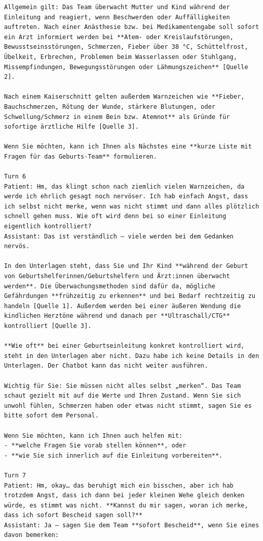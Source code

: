 \begin{Verbatim}[fontsize=\small,breaklines=true,breakanywhere=true]
Allgemein gilt: Das Team überwacht Mutter und Kind während der Einleitung and reagiert, wenn Beschwerden oder Auffälligkeiten auftreten. Nach einer Anästhesie bzw. bei Medikamentengabe soll sofort ein Arzt informiert werden bei **Atem- oder Kreislaufstörungen, Bewusstseinsstörungen, Schmerzen, Fieber über 38 °C, Schüttelfrost, Übelkeit, Erbrechen, Problemen beim Wasserlassen oder Stuhlgang, Missempfindungen, Bewegungsstörungen oder Lähmungszeichen** [Quelle 2].  

Nach einem Kaiserschnitt gelten außerdem Warnzeichen wie **Fieber, Bauchschmerzen, Rötung der Wunde, stärkere Blutungen, oder Schwellung/Schmerz in einem Bein bzw. Atemnot** als Gründe für sofortige ärztliche Hilfe [Quelle 3].

Wenn Sie möchten, kann ich Ihnen als Nächstes eine **kurze Liste mit Fragen für das Geburts-Team** formulieren.

Turn 6
Patient: Hm, das klingt schon nach ziemlich vielen Warnzeichen, da werde ich ehrlich gesagt noch nervöser. Ich hab einfach Angst, dass ich selbst nicht merke, wenn was nicht stimmt und dann alles plötzlich schnell gehen muss. Wie oft wird denn bei so einer Einleitung eigentlich kontrolliert?
Assistant: Das ist verständlich — viele werden bei dem Gedanken nervös.

In den Unterlagen steht, dass Sie und Ihr Kind **während der Geburt von Geburtshelferinnen/Geburtshelfern und Ärzt:innen überwacht werden**. Die Überwachungsmethoden sind dafür da, mögliche Gefährdungen **frühzeitig zu erkennen** und bei Bedarf rechtzeitig zu handeln [Quelle 1]. Außerdem werden bei einer äußeren Wendung die kindlichen Herztöne während und danach per **Ultraschall/CTG** kontrolliert [Quelle 3].

**Wie oft** bei einer Geburtseinleitung konkret kontrolliert wird, steht in den Unterlagen aber nicht. Dazu habe ich keine Details in den Unterlagen. Der Chatbot kann das nicht weiter ausführen.

Wichtig für Sie: Sie müssen nicht alles selbst „merken“. Das Team schaut gezielt mit auf die Werte und Ihren Zustand. Wenn Sie sich unwohl fühlen, Schmerzen haben oder etwas nicht stimmt, sagen Sie es bitte sofort dem Personal.

Wenn Sie möchten, kann ich Ihnen auch helfen mit:
- **welche Fragen Sie vorab stellen können**, oder
- **wie Sie sich innerlich auf die Einleitung vorbereiten**.

Turn 7
Patient: Hm, okay… das beruhigt mich ein bisschen, aber ich hab trotzdem Angst, dass ich dann bei jeder kleinen Wehe gleich denken würde, es stimmt was nicht. **Kannst du mir sagen, woran ich merke, dass ich sofort Bescheid sagen soll?**
Assistant: Ja — sagen Sie dem Team **sofort Bescheid**, wenn Sie eines davon bemerken:


\end{Verbatim}
